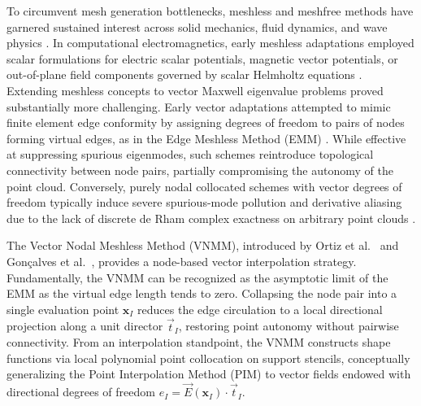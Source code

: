 \documentclass[VANCOUVER]{USG}
\begin{document}
To circumvent mesh generation bottlenecks, meshless and meshfree methods have garnered sustained interest across solid mechanics, fluid dynamics, and wave physics \cite{belytschko2023meshfree, liu2009mesh, fasshauer2007meshfree, atluri2004meshless}. In computational electromagnetics, early meshless adaptations employed scalar formulations for electric scalar potentials, magnetic vector potentials, or out-of-plane field components governed by scalar Helmholtz equations \cite{viana1999moving, ho2001moving, parreira2006element, nicomedes2012meshless}. Extending meshless concepts to vector Maxwell eigenvalue problems proved substantially more challenging. Early vector adaptations attempted to mimic finite element edge conformity by assigning degrees of freedom to pairs of nodes forming virtual edges, as in the Edge Meshless Method (EMM) \cite{lima2017edge}. While effective at suppressing spurious eigenmodes, such schemes reintroduce topological connectivity between node pairs, partially compromising the autonomy of the point cloud. Conversely, purely nodal collocated schemes with vector degrees of freedom typically induce severe spurious-mode pollution and derivative aliasing due to the lack of discrete de Rham complex exactness on arbitrary point clouds \cite{bossavit1990spurious, boffi2006finite}.

The Vector Nodal Meshless Method (VNMM), introduced by Ortiz et al.~\cite{ortiz2021nodal, ortiz2023tese} and Gon\c{c}alves et al.~\cite{goncalves2023vector, goncalves2025tese}, provides a node-based vector interpolation strategy. Fundamentally, the VNMM can be recognized as the asymptotic limit of the EMM as the virtual edge length tends to zero. Collapsing the node pair into a single evaluation point $\mathbf{x}_I$ reduces the edge circulation to a local directional projection along a unit director $\vec{t}_I$, restoring point autonomy without pairwise connectivity. From an interpolation standpoint, the VNMM constructs shape functions via local polynomial point collocation on support stencils, conceptually generalizing the Point Interpolation Method (PIM) \cite{liu2001point, liu2005introduction} to vector fields endowed with directional degrees of freedom $e_I = \vec{E}(\mathbf{x}_I) \cdot \vec{t}_I$.
\end{document}
